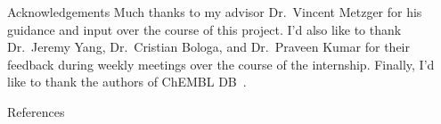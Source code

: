 \documentclass[final]{beamer}
\newlength{\sepwidth}
\newlength{\colwidth}
\newcommand{\separatorcolumn}{\begin{column}{\sepwidth}\end{column}}
\begin{document}
\begin{frame}[t]
\begin{columns}[t]
\begin{column}{\colwidth}
  \begin{block}{Acknowledgements}
  \small{
    Much thanks to my advisor Dr.~Vincent Metzger for his guidance and input over the course of this project. I'd also like to thank Dr.~Jeremy Yang, Dr.~Cristian Bologa, and Dr.~Praveen Kumar for their feedback during weekly meetings over the course of the internship. Finally, I'd like to thank the   authors of ChEMBL DB~\cite{chembl_db_2023}.}
  \end{block}

  \begin{block}{References}
    \tiny{}
  \end{block}

\end{column}

\separatorcolumn
\end{columns}
\end{frame}
\end{document}

